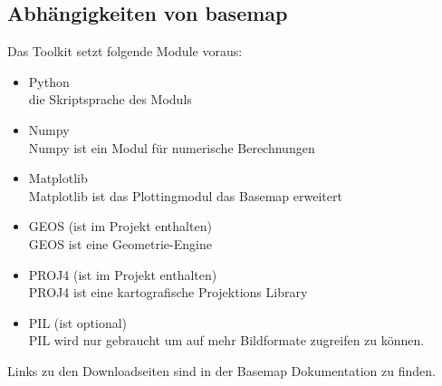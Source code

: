 \subsection{Abhängigkeiten von basemap}
Das Toolkit setzt folgende Module voraus:
\newline
\begin{itemize}
 \item Python \\
 die Skriptsprache des Moduls
 \item Numpy\\
 Numpy ist ein Modul für numerische Berechnungen
 \item Matplotlib\\
 Matplotlib ist das Plottingmodul das Basemap erweitert
 \item GEOS (ist im Projekt enthalten)\\
 GEOS ist eine Geometrie-Engine
 \item PROJ4 (ist im Projekt enthalten)\\
 PROJ4 ist eine kartografische Projektions Library
 \item PIL (ist optional)\\
 PIL wird nur gebraucht um auf mehr Bildformate zugreifen zu können.\\
\end{itemize}
Links zu den Downloadseiten sind in der \textsf{Basemap} Dokumentation zu finden.